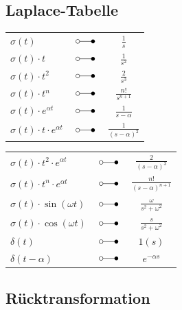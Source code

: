 	\subsection{Laplace-Tabelle}
	\begin{multicols}{2}
		\begin{center}
			\begin{tabular}{|lcc|}
				\hline
				$\sigma \left( t \right)$ & $\; \laplace \;$ & $\frac{1}{s}$ \\
				$\sigma \left( t \right) \cdot t$ & $\; \laplace \;$ & $\frac{1}{s^2}$\\
				$\sigma \left( t \right) \cdot t^2$ & $\; \laplace \;$ & $\frac{2}{s^3}$\\
				$\sigma \left( t \right) \cdot t^n$ & $\; \laplace \;$ & $\frac{n!}{s^{n+1}}$\\
				$\sigma \left( t \right) \cdot e^{\alpha t}$ & $\; \laplace \;$ &
				$\frac{1}{s-\alpha}$\\
				$\sigma \left( t \right) \cdot t \cdot e^{\alpha t}$ & $\; \laplace \;$ &
				$\frac{1}{( s - \alpha )^2}$\\
				\hline
			\end{tabular}
		\end{center}
	\columnbreak
		\begin{center}
			\begin{tabular}{|lcc|}
				\hline
				$\sigma \left( t \right)\cdot t^2 \cdot e^{\alpha t}$ &
				$\; \laplace \;$ & $\frac{2}{{( s - \alpha )}^3}$\\
				$\sigma \left( t \right)\cdot t^n \cdot e^{ \alpha t}$ &
				$\; \laplace \;$ & $\frac{n!}{(s-\alpha)^{n+1}}$\\
				$\sigma \left( t \right) \cdot \sin \left(\omega t \right)$ & $\; \laplace \;$ &
				$\frac{\omega}{s^2 + {\omega^2}}$\\
				$\sigma \left( t \right) \cdot \cos \left( \omega t \right)$ & $\; \laplace \;$ &
				$\frac{s}{ s^2 + \omega^2}$\\
				$\delta \left( t \right)$ & $\; \laplace \;$ & $1\left( s \right)$ \\
				$\delta \left( t - \alpha \right)$ & $\; \laplace \;$ & $e^{- \alpha s}$\\
				\hline
			\end{tabular}
		\end{center}
	\end{multicols}
		
	\subsection{Rücktransformation}

